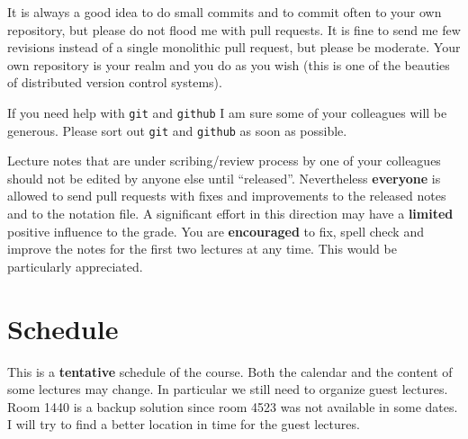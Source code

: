 \documentclass[a4paper,justified]{tufte-handout}
\begin{document}
It is always a good idea to do small commits and to commit often to
your own repository, but please do not flood me with pull requests.
It is fine to send me few revisions instead of a single monolithic
pull request, but please be moderate.  Your own repository is your
realm and you do as you wish (this is one of the beauties of
distributed version control systems).

If you need help with \texttt{git} and \texttt{github} I am sure some
of your colleagues will be generous. Please sort out \texttt{git} and
\texttt{github} as soon as possible.

Lecture notes that are under scribing/review process by one of your
colleagues should not be edited by anyone else until “released”.
Nevertheless \textbf{everyone} is allowed to send pull requests with
fixes and improvements to the released notes and to the notation file.
A significant effort in this direction may have a \textbf{limited}
positive influence to the grade.  You are \textbf{encouraged} to fix,
spell check and improve the notes for the first two lectures at any
time. This would be particularly appreciated.


\pagebreak

\section{Schedule}


This is a \textbf{tentative} schedule of the course. Both the calendar
and the content of some lectures may change. In particular we still
need to organize guest lectures.  Room 1440 is a backup solution since
room 4523 was not available in some dates. I will try to find a better
location in time for the guest lectures.
\end{document}
